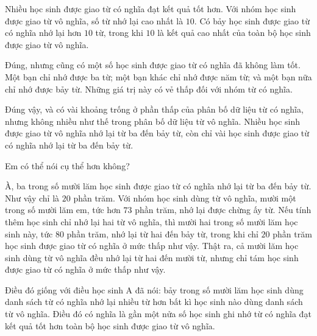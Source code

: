 {\begin{scriptlist}
      \item [Học sinh A:] Nhiều học sinh được giao từ có nghĩa đạt kết quả tốt hơn. Với nhóm học sinh được giao từ vô nghĩa, số từ nhớ lại cao nhất là $10$. Có bảy học sinh được giao từ có nghĩa nhớ lại hơn $10$ từ, trong khi $10$ là kết quả cao nhất của toàn bộ học sinh được giao từ vô nghĩa. \vspace{\baselineskip}
      
      \item [Học sinh B:] Đúng, nhưng cũng có một số học sinh được giao từ có nghĩa đã không làm tốt. Một bạn chỉ nhớ được ba từ; một bạn khác chỉ nhớ được năm từ; và một bạn nữa chỉ nhớ được bảy từ. Những giá trị này có vẻ thấp đối với nhóm từ có nghĩa.
      
      \item [Học sinh C:] Đúng vậy, và có vài khoảng trống ở phần thấp của phân bố dữ liệu từ có nghĩa, nhưng không nhiều như thế trong phân bố dữ liệu từ vô nghĩa. Nhiều học sinh được giao từ vô nghĩa nhớ lại từ ba đến bảy từ, còn chỉ vài học sinh được giao từ có nghĩa nhớ lại từ ba đến bảy từ.\vspace{2\baselineskip}
      
      \item [Giáo viên:] Em có thể nói cụ thể hơn không?
      
      \item [Học sinh C:] À, ba trong số mười lăm học sinh được giao từ có nghĩa nhớ lại từ ba đến bảy từ. Như vậy chỉ là $20$ phần trăm. Với nhóm học sinh dùng từ vô nghĩa, mười một trong số mười lăm em, tức hơn $73$ phần trăm, nhớ lại được chừng ấy từ. Nếu tính thêm học sinh chỉ nhớ lại hai từ vô nghĩa, thì mười hai trong số mười lăm học sinh này, tức $80$ phần trăm, nhớ lại từ hai đến bảy từ, trong khi chỉ $20$ phần trăm học sinh được giao từ có nghĩa ở mức thấp như vậy. Thật ra, cả mười lăm học sinh dùng từ vô nghĩa đều nhớ lại từ hai đến mười từ, nhưng chỉ tám học sinh được giao từ có nghĩa ở mức thấp như vậy.\vspace{2\baselineskip}
      
      \item [Giáo viên:] Điều đó giống với điều học sinh A đã nói: bảy trong số mười lăm học sinh dùng danh sách từ có nghĩa nhớ lại nhiều từ hơn bất kì học sinh nào dùng danh sách từ vô nghĩa. Điều đó có nghĩa là gần một nửa số học sinh ghi nhớ từ có nghĩa đạt kết quả tốt hơn toàn bộ học sinh được giao từ vô nghĩa.\vspace{\baselineskip}
      

\end{scriptlist}}
